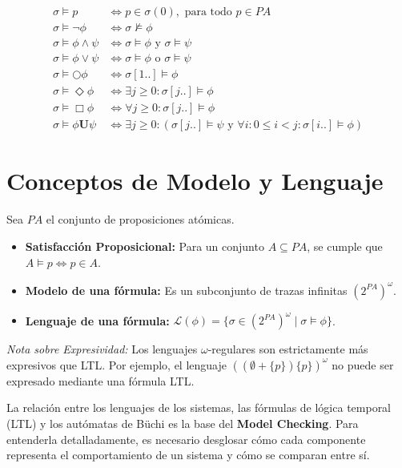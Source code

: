\documentclass[11pt,a4paper]{article}
\begin{document}
\begin{equation*}
\begin{aligned}
\sigma \models p & \iff p \in \sigma(0), \text{ para todo } p \in PA \\
\sigma \models \neg \phi & \iff \sigma \not\models \phi \\
\sigma \models \phi \wedge \psi & \iff \sigma \models \phi \text{ y } \sigma \models \psi \\
\sigma \models \phi \vee \psi & \iff \sigma \models \phi \text{ o } \sigma \models \psi \\
\sigma \models \bigcirc \phi & \iff \sigma[1..] \models \phi \\
\sigma \models \Diamond \phi & \iff \exists j \geq 0 : \sigma[j..] \models \phi \\
\sigma \models \Box \phi & \iff \forall j \geq 0 : \sigma[j..] \models \phi \\
\sigma \models \phi \mathbf{U} \psi & \iff \exists j \geq 0 : (\sigma[j..] \models \psi \text{ y } \forall i : 0 \leq i < j : \sigma[i..] \models \phi)
\end{aligned}
\end{equation*}

\section{Conceptos de Modelo y Lenguaje}
Sea $PA$ el conjunto de proposiciones atómicas.

\begin{itemize}
    \item \textbf{Satisfacción Proposicional:} Para un conjunto $A \subseteq PA$, se cumple que $A \models p \iff p \in A$.
    \item \textbf{Modelo de una fórmula:} Es un subconjunto de trazas infinitas $(2^{PA})^\omega$.
    \item \textbf{Lenguaje de una fórmula:} $\mathcal{L}(\phi) = \{ \sigma \in (2^{PA})^\omega \mid \sigma \models \phi \}$.
\end{itemize}

\textit{Nota sobre Expresividad:} Los lenguajes $\omega$-regulares son estrictamente más expresivos que LTL. Por ejemplo, el lenguaje $( (\emptyset + \{p\}) \{p\} )^\omega$ no puede ser expresado mediante una fórmula LTL.

La relación entre los lenguajes de los sistemas, las fórmulas de lógica temporal (LTL) y los autómatas de Büchi es la base del \textbf{Model Checking}. Para entenderla detalladamente, es necesario desglosar cómo cada componente representa el comportamiento de un sistema y cómo se comparan entre sí.
\end{document}
